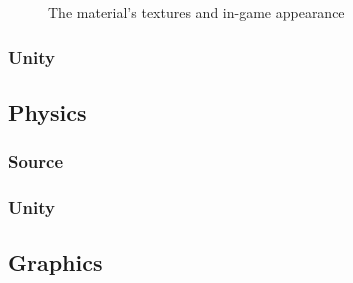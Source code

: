 \documentclass[a4paper, 12pt]{scrartcl}
\begin{document}
\begin{figure}[!htp]
  \centering
  \qquad
  \caption{The material's textures and in-game appearance}
  \label{fig:source_texture}
\end{figure}

\subsubsection{Unity}

\subsection{Physics}
\subsubsection{Source}
\subsubsection{Unity}

\subsection{Graphics}
\end{document}

